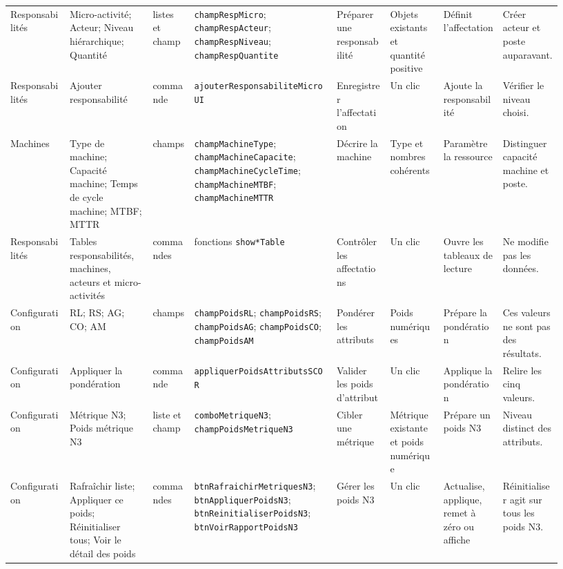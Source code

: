 \begin{landscape}
{\begin{longtable}{L{0.10\linewidth} L{0.14\linewidth} L{0.07\linewidth} L{0.24\linewidth} L{0.09\linewidth} L{0.09\linewidth} L{0.10\linewidth} L{0.10\linewidth}}
Responsabilités & Micro-activité; Acteur; Niveau hiérarchique; Quantité & listes et champ & \texttt{champRespMicro}; \texttt{champRespActeur}; \texttt{champRespNiveau}; \texttt{champRespQuantite} & Préparer une responsabilité & Objets existants et quantité positive & Définit l'affectation & Créer acteur et poste auparavant. \\
Responsabilités & Ajouter responsabilité & commande & \texttt{ajouterResponsabiliteMicroUI} & Enregistrer l'affectation & Un clic & Ajoute la responsabilité & Vérifier le niveau choisi. \\
Machines & Type de machine; Capacité machine; Temps de cycle machine; MTBF; MTTR & champs & \texttt{champMachineType}; \texttt{champMachineCapacite}; \texttt{champMachineCycleTime}; \texttt{champMachineMTBF}; \texttt{champMachineMTTR} & Décrire la machine & Type et nombres cohérents & Paramètre la ressource & Distinguer capacité machine et poste. \\
Responsabilités & Tables responsabilités, machines, acteurs et micro-activités & commandes & fonctions \texttt{show*Table} & Contrôler les affectations & Un clic & Ouvre les tableaux de lecture & Ne modifie pas les données. \\

Configuration & RL; RS; AG; CO; AM & champs & \texttt{champPoidsRL}; \texttt{champPoidsRS}; \texttt{champPoidsAG}; \texttt{champPoidsCO}; \texttt{champPoidsAM} & Pondérer les attributs & Poids numériques & Prépare la pondération & Ces valeurs ne sont pas des résultats. \\
Configuration & Appliquer la pondération & commande & \texttt{appliquerPoidsAttributsSCOR} & Valider les poids d'attribut & Un clic & Applique la pondération & Relire les cinq valeurs. \\
Configuration & Métrique N3; Poids métrique N3 & liste et champ & \texttt{comboMetriqueN3}; \texttt{champPoidsMetriqueN3} & Cibler une métrique & Métrique existante et poids numérique & Prépare un poids N3 & Niveau distinct des attributs. \\
Configuration & Rafraîchir liste; Appliquer ce poids; Réinitialiser tous; Voir le détail des poids & commandes & \texttt{btnRafraichirMetriquesN3}; \texttt{btnAppliquerPoidsN3}; \texttt{btnReinitialiserPoidsN3}; \texttt{btnVoirRapportPoidsN3} & Gérer les poids N3 & Un clic & Actualise, applique, remet à zéro ou affiche & Réinitialiser agit sur tous les poids N3. \\


\end{longtable}}
\end{landscape}
